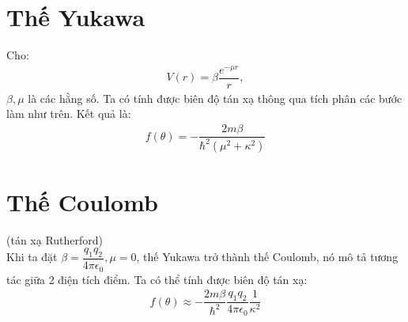 \documentclass{report}
\newcommand{\f}[2]{\dfrac{#1}{#2}}
\begin{document}
\section{Thế Yukawa}
Cho:
\begin{align}
	V(r) = \beta \f{e^{-\mu r}}{r},
\end{align}
$\beta,\mu$ là các hằng số. Ta có tính được biên độ tán xạ thông qua tích phân các bước làm như trên. Kết quả là:
\begin{align}
	f(\theta) = -\f{2m\beta}{\hbar^2\left(\mu^2 + \kappa^2\right)}
\end{align}
\section{Thế Coulomb}(tán xạ Rutherford)\\
Khi ta đặt $\beta = \f{q_1 q_2}{4\pi\epsilon_0},\mu = 0$, thế Yukawa trở thành thế Coulomb, nó mô tả tương tác giữa 2 điện tích điểm. Ta có thể tính được biên độ tán xạ:
\begin{align}
	f(\theta) \approx  -\f{2m\beta}{\hbar^2} \f{q_1 q_2}{4\pi\epsilon_0}\f{1}{\kappa^2}
\end{align}
\end{document}
